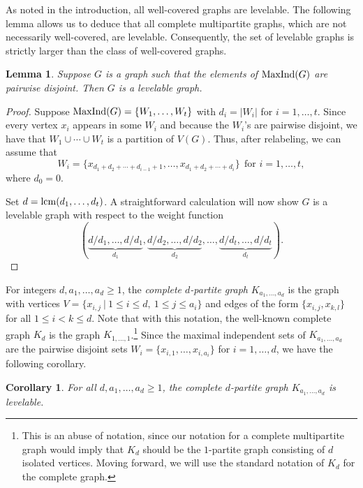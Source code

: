 \documentclass[12pt]{amsart}
\numberwithin{equation}{section}
\newtheorem{lemma}[theorem]{Lemma}
\newtheorem{corollary}[theorem]{Corollary}
\theoremstyle{definition}
\newcounter{i} %
\begin{document}
As noted in the introduction, all well-covered graphs
are levelable.  The following lemma allows us to deduce that
all complete multipartite graphs, which are not necessarily well-covered,
are levelable. Consequently, the set of levelable graphs
is strictly larger than the class of well-covered graphs.

\begin{lemma}\label{lem.pairwise} Suppose $G$ is a graph such
that the elements of  ${\rm MaxInd}(G)$ are pairwise 
disjoint.  Then $G$ is a levelable graph.
\end{lemma}

\begin{proof}
    Suppose ${\rm MaxInd}(G) = \{W_1,\ldots,W_t\}$
    with $d_i = |W_i|$ for $i =1,\ldots,t$.
    Since every vertex $x_i$ appears in some $W_i$
    and because the $W_i$'s are pairwise disjoint, we have that
    $W_1 \cup \cdots \cup W_t$ is a partition of $V(G)$.
    Thus, after relabeling, we can
    assume that 
    \[W_i = \{x_{d_1+d_2+ \cdots + d_{i-1}+1},\ldots,
    x_{d_1+d_2+\cdots +d_i}\} ~~\mbox{for $i=1,\ldots,t$},\] where $d_{0}=0.$
    
    Set $d = {\rm lcm}(d_1,\ldots,d_t)$.  A straightforward
    calculation will now show $G$ is a levelable
    graph with respect to the weight function
    \[(\underbrace{d/d_1,\ldots,d/d_1}_{d_1},\underbrace{d/d_2,\ldots,d/d_2}_{d_2},\ldots, 
    \underbrace{d/d_t,\ldots,d/d_t}_{d_t}).\]
\end{proof}

For integers $d, a_1,\ldots, a_d \geq 1$,
the {\it complete $d$-partite graph} $K_{a_1,\ldots,a_d}$
is the graph with vertices 
$V = \{x_{i,j} ~|~ 1 \leq i \leq d, ~1 \leq j \leq a_i\}$ and edges of the form
$\{x_{i,j},x_{k,l}\}$ for all $1 \leq i < k \leq d$.  
Note that with this notation, the well-known
complete graph $K_d$ is the graph $K_{1,\ldots,1}$.\footnote[1]{This is an abuse 
of notation, since our notation for a complete multipartite graph would imply that $K_d$ should
be the  $1$-partite graph consisting
of $d$ isolated vertices.  Moving forward,
we will use the standard notation of $K_d$ for 
the complete graph.} Since
the maximal independent sets of $K_{a_1,\ldots,a_d}$ 
are the pairwise disjoint sets
$W_i = \{x_{i,1},\ldots,x_{i,a_i}\}$ for $i=1,\ldots,d$, we have
the following corollary.
\begin{corollary}\label{cor:multipartite}
    For all $d, a_1,\ldots,a_d \geq 1$, the
    complete $d$-partite graph $K_{a_1,\ldots,a_d}$ 
    is levelable.
\end{corollary}
\end{document}
